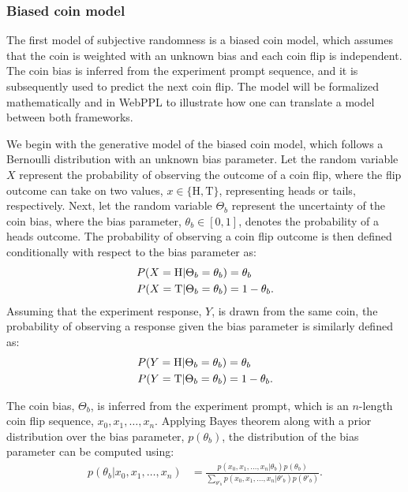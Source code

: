 \documentclass{article}
\begin{document}
\subsubsection{Biased coin model}
\label{s:tutorial:sss:biased}

The first model of subjective randomness is a biased coin model, which assumes that the coin is weighted with an unknown bias and each coin flip is independent. The coin bias is inferred from the experiment prompt sequence, and it is subsequently used to predict the next coin flip. The model will be formalized mathematically and in WebPPL to illustrate how one can translate a model between both frameworks.

We begin with the generative model of the biased coin model, which follows a Bernoulli distribution with an unknown bias parameter. Let the random variable $X$ represent the probability of observing the outcome of a coin flip, where the flip outcome can take on two values, $x \in \{\textrm{H},\textrm{T}\}$, representing heads or tails, respectively. Next, let the random variable $\Theta_b$ represent the uncertainty of the coin bias, where the bias parameter, $\theta_b \in [0,1]$, denotes the probability of a heads outcome. The probability of observing a coin flip outcome is then defined conditionally with respect to the bias parameter as:
\begin{align}
    P(X = \textrm{H} | \Theta_b = \theta_b) &= \theta_b \notag \\ 
    P(X = \textrm{T} | \Theta_b = \theta_b) &= 1 - \theta_b \label{eq:bcoin_x}.
\end{align}
Assuming that the experiment response, $Y$, is drawn from the same coin, the probability of observing a response given the bias parameter is similarly defined as: 
\begin{align}
    P(Y = \textrm{H} | \Theta_b = \theta_b) &= \theta_b \notag \\ 
    P(Y = \textrm{T} | \Theta_b = \theta_b) &= 1 - \theta_b \label{eq:bcoin_y}.
\end{align}

The coin bias, $\Theta_b$, is inferred from the experiment prompt, which is an $n$-length coin flip sequence, $x_0, x_1, \dots, x_n$. Applying Bayes theorem along with a prior distribution over the bias parameter, $p(\theta_b)$, the distribution of the bias parameter can be computed using:
\begin{align}
    p(\theta_b | x_0, x_1, \dots, x_n) &= \frac{p(x_0,x_1, \dots, x_n | \theta_b)p(\theta_b)} {\sum\limits_{\theta'_b} p(x_0, x_1, \dots, x_n | \theta'_b)p(\theta'_b)} \label{eq:bcoin_bayes}.
\end{align}
\end{document}
